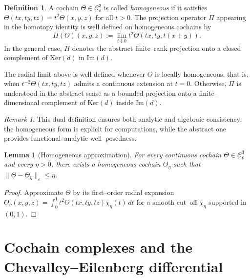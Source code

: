 \documentclass[10pt]{amsart}
\numberwithin{equation}{section}
\newtheorem{lem}[theorem]{Lemma}
\theoremstyle{remark}
\newtheorem{rmk}[theorem]{Remark}
\theoremstyle{definition}
\newtheorem{dfn}[theorem]{Definition}
\begin{document}
\begin{dfn}
A cochain $\Theta\in\mathcal C^3_\varepsilon$ is called \emph{homogeneous}
if it satisfies $\Theta(tx,ty,tz)=t^2\Theta(x,y,z)$ for all $t>0$.
The projection operator $\Pi$ appearing in the homotopy identity is
well defined on homogeneous cochains by
\[
\Pi(\Theta)(x,y,z)
:= \lim_{t\downarrow0} t^2\Theta(tx,ty,t(x+y)).
\]
In the general case, $\Pi$ denotes the abstract finite–rank projection
onto a closed complement of $\mathrm{Ker}(d)$ in $\mathrm{Im}(d)$.
\end{dfn}
\noindent
The radial limit above is well defined whenever $\Theta$ is locally homogeneous,
that is, when $t^{-2}\Theta(tx,ty,tz)$ admits a continuous extension at $t=0$.
Otherwise, $\Pi$ is understood in the abstract sense as a bounded projection
onto a finite–dimensional complement of $\mathrm{Ker}(d)$ inside $\mathrm{Im}(d)$.


\begin{rmk}
This dual definition ensures both analytic and algebraic consistency:
the homogeneous form is explicit for computations,
while the abstract one provides functional–analytic well–posedness.
\end{rmk}
\begin{lem}[Homogeneous approximation]\label{lem:1}
For every continuous cochain $\Theta\in\mathcal{C}^3_\varepsilon$ and every $\eta>0$,
there exists a homogeneous cochain $\Theta_\eta$ such that
$\|\Theta-\Theta_\eta\|_\varepsilon\le \eta$.
\end{lem}
\begin{proof}
Approximate $\Theta$ by its first–order radial expansion
$\Theta_\eta(x,y,z)=\int_0^1 t^2\Theta(tx,ty,tz)\chi_\eta(t)\,dt$
for a smooth cut–off $\chi_\eta$ supported in $(0,1)$.
\end{proof}


\section{Cochain complexes and the Chevalley--Eilenberg differential}\label{sec:cochains}
\end{document}
